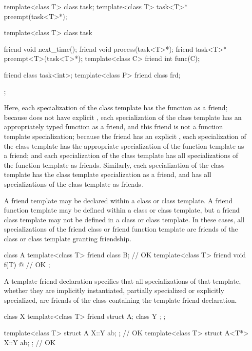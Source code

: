 \begin{example}
\begin{codeblock}
template<class T> class task;
template<class T> task<T>* preempt(task<T>*);

template<class T> class task {
  friend void next_time();
  friend void process(task<T>*);
  friend task<T>* preempt<T>(task<T>*);
  template<class C> friend int func(C);

  friend class task<int>;
  template<class P> friend class frd;
};
\end{codeblock}

Here,
each specialization of the
class template has the function
as a friend;
because
does not have explicit
,
each specialization of the
class template has an appropriately typed function
as a friend, and this friend is not a function template specialization;
because the friend
has an explicit
,
each specialization of the
class template has the appropriate specialization of the function
template
as a friend;
and each specialization of the
class template has all specializations of the function template
as friends.
Similarly,
each specialization of the
class template has the class template specialization
as a friend, and has all specializations of the class template
as friends.
\end{example}

\pnum
A friend template may be declared within a class or class template.
A friend function template may be defined within a class or class
template, but a friend class template may not be defined in a class
or class template.
In these cases, all specializations of the friend class or friend function
template are friends of the class or class template granting friendship.
\begin{example}
\begin{codeblock}
class A {
  template<class T> friend class B;                 // OK
  template<class T> friend void f(T){ @\commentellip@ }   // OK
};
\end{codeblock}
\end{example}

\pnum
A template friend declaration specifies that all specializations of that
template, whether they are implicitly instantiated, partially
specialized or explicitly specialized,
are friends of the class containing the template friend declaration.
\begin{example}
\begin{codeblock}
class X {
  template<class T> friend struct A;
  class Y { };
};

template<class T> struct A { X::Y ab; };            // OK
template<class T> struct A<T*> { X::Y ab; };        // OK
\end{codeblock}
\end{example}

